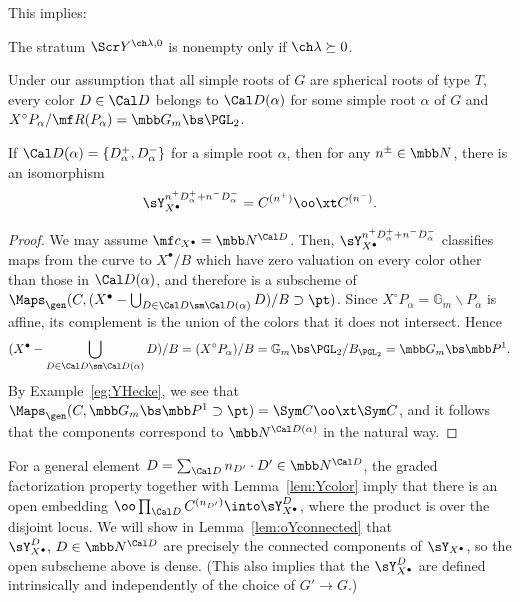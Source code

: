 This implies:

\begin{lem}
\notready \label{lem:Ynonempty}
The stratum $\Scr Y^{\ch\lambda,0}$ is nonempty only if $\ch\lambda \succeq 0$.
\end{lem}



Under our assumption that all simple roots of $G$ are spherical roots of type $T$,
every color $D\in \Cal D$ belongs to $\Cal D(\alpha)$ for some simple root $\alpha$ of $G$
and $X^\circ P_\alpha/\mf R(P_\alpha) = \mbb G_m \bs \PGL_2$.

\begin{lem}
\notready \label{lem:Ycolor}
If $\Cal D(\alpha) = \{ D_\alpha^+, D_\alpha^- \}$ for a simple root $\alpha$,
then for any $n^\pm \in \mbb N$,
there is an isomorphism
\[ \sY^{n^+ D_\alpha^+ + n^- D_\alpha^-}_{X^\bullet} = C^{(n^+)}\oo\xt C^{(n^-)}. \]
\end{lem}
\begin{proof}
We may assume $\mf c_{X^\bullet} = \mbb N^{\Cal D}$. Then,
$\sY^{n^+ D_\alpha^+ + n^- D_\alpha^-}_{X^\bullet}$
classifies maps from the curve to $X^\bullet/B$ which have zero valuation on every color other than those in $\Cal D(\alpha)$, and therefore is a subscheme of $\Maps_\gen(C, (X^\bullet-\bigcup_{D\in \Cal D \sm \Cal D(\alpha)} D)/B \supset \pt)$.
Since $X^\circ P_\alpha = \mathbb G_m\backslash P_\alpha$ is affine, its complement is the union of the colors that it does not intersect. Hence
\[ (X^\bullet-\bigcup_{D\in \Cal D \sm \Cal D(\alpha)}D)/B = (X^\circ P_\alpha)/B = \mathbb G_m\bs\PGL_2/B_{\PGL_2} = \mbb G_m \bs \mbb P^1.\]
By Example~\ref{eg:YHecke}, we see that $\Maps_\gen(C, \mbb G_m \bs \mbb P^1 \supset \pt) = \Sym C \oo\xt \Sym C$,
and it follows that the components correspond to $\mbb N^{\Cal D(\alpha)}$ in
the natural way.
\end{proof}



\begin{rem}
\notready \label{rem:Ycomp}
For a general element $D = \sum_{\Cal D} n_{D'}\cdot D' \in \mbb N^{\Cal D}$,
the graded factorization property together with Lemma~\ref{lem:Ycolor} imply
that there is an open embedding
$\oo\prod_{\Cal D} C^{(n_{D'})} \into \sY^D_{X^\bullet}$,
where the product is over the disjoint locus.
We will show in Lemma~\ref{lem:oYconnected} that
$\sY^D_{X^\bullet},\, D\in \mbb N^{\Cal D}$ are precisely the connected components
of $\sY_{X^\bullet}$, so the open subscheme above is dense.
(This also implies that the $\sY^D_{X^\bullet}$ are defined intrinsically and independently
of the choice of $G'\to G$.)
\end{rem}


